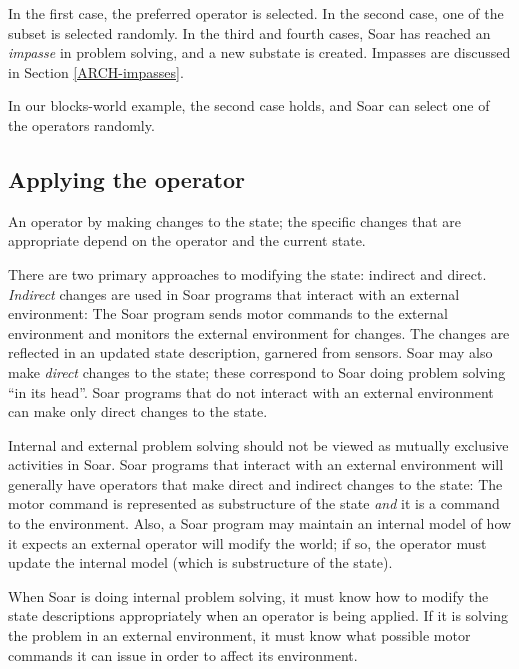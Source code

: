 In the first case, the preferred operator is selected.  In the second
case, one of the subset is selected randomly. In the third and fourth
cases, Soar has reached an \emph{impasse} in problem solving, and a new
substate is created.  Impasses are discussed in Section
\ref{ARCH-impasses}.

In our blocks-world example, the second case holds, and Soar can select one of
the operators randomly.

\subsection{Applying the operator}

An operator  by making changes to the state; the specific changes
that are appropriate depend on the operator and the current state.

There are two primary approaches to modifying the state: indirect and direct.
\emph{Indirect} changes are used in Soar programs that interact with
an external environment: The Soar program sends motor commands to the
external environment and monitors the external environment for
changes. The changes are reflected in an updated state description,
garnered from sensors. Soar may also make \emph{direct} changes to the
state; these correspond to Soar doing problem solving ``in its
head''. Soar programs that do not interact with an external environment
can make only direct changes to the state.

Internal and external problem solving should not be viewed as mutually
exclusive activities in Soar. Soar programs that interact with an
external environment will generally have operators that make direct and
indirect changes to the state: The motor command is represented as
substructure of the state \emph{and} it is a command to the environment. Also, a Soar program may maintain an internal
model of how it expects an external operator will modify the world; if
so, the operator must update the internal model (which is substructure
of the state).

When Soar is doing internal problem solving, it must know how to modify
the state descriptions appropriately when an operator is being
applied. If it is solving the problem in an external environment, it
must know what possible motor commands it can issue in order to affect
its environment.

